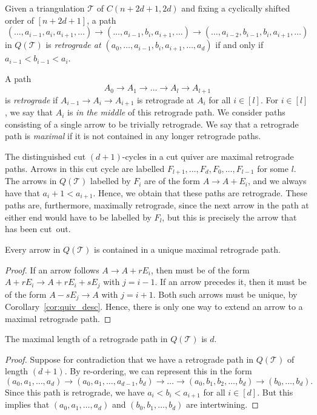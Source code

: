 \documentclass[ALCO,Unicode,published]{cedram}
\newcommand{\ivec}{E_{i}} %
\newcommand{\rvec}{r\ivec} %
\newcommand{\sv}[1]{sE_{#1}} %
\begin{document}
\begin{defi}\label{def:retro}
Given a triangulation $\mathcal{T}$ of $C(n + 2d + 1, 2d)$ and fixing a cyclically shifted order of $[n + 2d + 1]$, a path \[(\dots, a_{i - 1}, a_{i}, a_{i + 1}, \dots) \to (\dots, a_{i - 1}, b_{i}, a_{i + 1}, \dots) \to (\dots, a_{i - 2}, b_{i - 1}, b_{i}, a_{i + 1}, \dots)\] in $Q(\mathcal{T})$ is \emph{retrograde at $(a_{0}, \dots, a_{i - 1}, b_{i}, a_{i + 1}, \dots, a_{d})$} if and only if $a_{i - 1} < b_{i - 1} < a_{i}$.

A path \[A_{0} \rightarrow A_{1} \rightarrow \dots \rightarrow A_{l} \rightarrow A_{l+1}\] is \emph{retrograde} if $A_{i-1} \rightarrow A_{i} \rightarrow A_{i+1}$ is retrograde at $A_{i}$ for all $i \in [l]$. For $i \in [l]$, we say that $A_{i}$ is \emph{in the middle} of this retrograde path. We consider paths consisting of a single arrow to be trivially retrograde. We say that a retrograde path is \emph{maximal} if it is not contained in any longer retrograde paths.
\end{defi}

\begin{rema}
The distinguished cut $(d + 1)$-cycles in a cut quiver are maximal retrograde paths. Arrows in this cut cycle are labelled $F_{l + 1}, \dots, F_{d}, F_{0}, \dots, F_{l - 1}$ for some $l$. The arrows in $Q(\mathcal{T})$ labelled by $F_{i}$ are of the form $A \to A + E_{i}$, and we always have that $a_{i} + 1 < a_{i + 1}$. Hence, we obtain that these paths are retrograde. These paths are, furthermore, maximally retrograde, since the next arrow in the path at either end would have to be labelled by $F_{l}$, but this is precisely the arrow that has been cut~out.
\end{rema}

\begin{lemma}
Every arrow in $Q(\mathcal{T})$ is contained in a unique maximal retrograde path.
\end{lemma}
\begin{proof}
If an arrow follows $A \to A + \rvec$, then must be of the form $A + \rvec \to A + \rvec + \sv{j}$ with $j = i - 1$. If an arrow precedes it, then it must be of the form $A - \sv{j} \to A$ with $j = i + 1$. Both such arrows must be unique, by Corollary~\ref{cor:quiv_desc}. Hence, there is only one way to extend an arrow to a maximal retrograde path.
\end{proof}

\begin{prop}
The maximal length of a retrograde path in $Q(\mathcal{T})$ is $d$.
\end{prop}
\begin{proof}
Suppose for contradiction that we have a retrograde path in $Q(\mathcal{T})$ of length $(d+1)$. By re-ordering, we can represent this in the form \[(a_{0}, a_{1}, \dots, a_{d}) \rightarrow (a_{0}, a_{1}, \dots, a_{d - 1}, b_{d})\rightarrow \dots \rightarrow (a_{0}, b_{1}, b_{2}, \dots, b_{d}) \rightarrow (b_{0}, \dots, b_{d}).\] Since this path is retrograde, we have $a_{i} < b_{i} < a_{i + 1}$ for all $i \in [d]$. But this implies that $(a_{0}, a_{1}, \dots, a_{d})$ and $(b_{0}, b_{1}, \dots, b_{d})$ are intertwining.
\end{proof}
\end{document}
